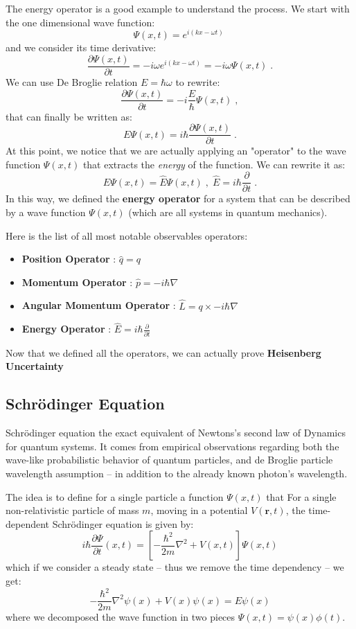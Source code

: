\documentclass[12pt,a4paper]{article}
\begin{document}
The energy operator is a good example to understand the process.
We start with the one dimensional wave function:
$$\Psi(x,t) = e^{i(kx-\omega t)}\;$$
and we consider its time derivative:
$$\dfrac{\partial\Psi(x,t)}{\partial t} = -i\omega e^{i(kx-\omega t)} = -i\omega \Psi(x,t)\;.$$
We can use De Broglie relation $E = \hbar \omega$ to rewrite:
$$\dfrac{\partial\Psi(x,t)}{\partial t} = -i\frac{E}{\hbar}\Psi(x,t)\;,$$
that can finally be written as:
$$ E\Psi(x,t) = i\hbar \frac{\partial \Psi(x,t)}{\partial t} \;.$$
At this point, we notice that we are actually applying an "operator" to the wave function $\Psi(x,t)$ that extracts the \textit{energy} of the function. We can rewrite it as:
$$ E\Psi(x,t) = \hat{E} \Psi(x,t) \;,\; \hat{E}=i\hbar \frac{\partial }{\partial t}\;.$$
In this way, we defined the \textbf{energy operator} for a system that can be described by a wave function $\Psi(x,t)$ (which are all systems in quantum mechanics).

Here is the list of all most notable observables operators:
\begin{itemize}
	\item \textbf{Position Operator} : $\hat{q} = q$
	\item \textbf{Momentum Operator} : $\hat{p} = -i\hbar \nabla$
	\item \textbf{Angular Momentum Operator} : $\hat{L} = q\times -i\hbar \nabla$
	\item \textbf{Energy Operator} : $\hat{E}=i\hbar \frac{\partial }{\partial t}$
\end{itemize}

Now that we defined all the operators, we can actually prove \textbf{Heisenberg Uncertainty}
\subsection{Schrödinger Equation}
Schrödinger equation the exact equivalent of Newtons's second law of Dynamics for quantum systems.
It comes from empirical observations regarding both the wave-like probabilistic behavior of quantum particles, and de Broglie particle wavelength assumption -- in addition to the already known photon's wavelength.

The idea is to define for a single particle a function $\Psi(x,t)$ that 
For a single non-relativistic particle of mass $m$, moving in a potential $V(\mathbf{r},t)$, the time-dependent Schrödinger equation is given by:
\begin{equation*}
i \hbar \dfrac{\partial \Psi}{\partial t}(x,t) = \left[-\dfrac{\hbar^2}{2m} \nabla^2 + V(x,t) \right] \Psi(x,t)
\end{equation*}
which if we consider a steady state -- thus we remove the time dependency -- we get:
\begin{equation*}
-\dfrac{\hbar^2}{2m} \nabla^2 \psi(x) + V(x) \psi(x) = E \psi(x)
\end{equation*}
where we decomposed the wave function in two pieces $\Psi(x,t) = \psi(x) \phi(t)$.
\end{document}
